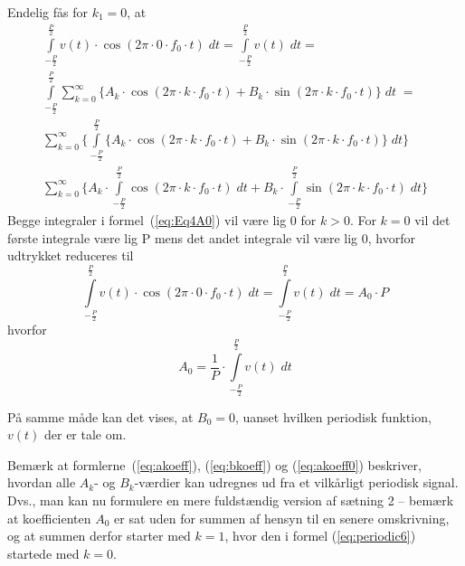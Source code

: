 \documentclass[11pt,a4paper]{article}
\begin{document}
\noindent{}Endelig fås for $k_1=0$, at
\begin{gather}
%
\int\limits_{-\frac{P}{2}}^{\frac{P}{2}}v(t)\cdot\cos(2\pi\cdot{}0\cdot{}f_{0}\cdot{}t)\;dt = \int\limits_{-\frac{P}{2}}^{\frac{P}{2}}v(t)\;dt =\nonumber\\
%
\int\limits_{-\frac{P}{2}}^{\frac{P}{2}}\sum_{k=0}^{\infty} \big\lbrace{}A_{k}\cdot\cos(2\pi\cdot{}k\cdot{}f_{0}\cdot{}t)+B_{k}\cdot\sin(2\pi\cdot{}k\cdot{}f_{0}\cdot{}t)\big\rbrace\;dt\;=\nonumber\\
%
\sum_{k=0}^{\infty}\Bigg\lbrace\int\limits_{-\frac{P}{2}}^{\frac{P}{2}}\big\lbrace{}A_{k}\cdot\cos(2\pi\cdot{}k\cdot{}f_{0}\cdot{}t)+B_{k}\cdot\sin(2\pi\cdot{}k\cdot{}f_{0}\cdot{}t)\big\rbrace\;dt\Bigg\rbrace\nonumber\\
%
\sum_{k=0}^{\infty}\Bigg\lbrace
A_{k}\cdot\int\limits_{-\frac{P}{2}}^{\frac{P}{2}}\cos(2\pi\cdot{}k\cdot{}f_{0}\cdot{}t)\;dt + 
B_{k}\cdot\int\limits_{-\frac{P}{2}}^{\frac{P}{2}}\sin(2\pi\cdot{}k\cdot{}f_{0}\cdot{}t)\;dt
\Bigg\rbrace\label{eq:Eq4A0}
%
\end{gather}
Begge integraler i formel~(\ref{eq:Eq4A0}) vil være lig 0 for $k>0$. For $k=0$ vil det første integrale være lig P mens det andet integrale vil være lig 0, hvorfor udtrykket reduceres til
\begin{equation}
\int\limits_{-\frac{P}{2}}^{\frac{P}{2}}v(t)\cdot\cos(2\pi\cdot{}0\cdot{}f_{0}\cdot{}t)\;dt = \int\limits_{-\frac{P}{2}}^{\frac{P}{2}}v(t)\;dt = A_0\cdot{}P
\end{equation}
hvorfor
\begin{equation}
A_0 = \frac{1}{P}\cdot{}\int\limits_{-\frac{P}{2}}^{\frac{P}{2}}v(t)\;dt\label{eq:akoeff0}
\end{equation}

\noindent{}På samme måde kan det vises, at $B_0=0$, uanset hvilken periodisk funktion, $v(t)$ der er tale om. 

Bemærk at formlerne~(\ref{eq:akoeff}), (\ref{eq:bkoeff}) og (\ref{eq:akoeff0}) beskriver, hvordan alle $A_k$- og $B_k$-værdier kan udregnes ud fra et vilkårligt periodisk signal. Dvs., man kan nu formulere en mere fuldstændig version af sætning 2 -- bemærk at koefficienten $A_0$ er sat uden for summen af hensyn til en senere omskrivning, og at summen derfor starter med $k=1$, hvor den i formel (\ref{eq:periodic6}) startede med $k=0$.
\end{document}
